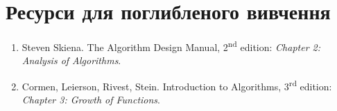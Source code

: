 \documentclass[12pt,a4paper]{report}
\begin{document}
\section*{Ресурси для поглибленого вивчення}
\begin{enumerate}
    \item Steven Skiena. The Algorithm Design Manual, 2\textsuperscript{nd} edition: {\itshape Chapter 2: Analysis of Algorithms}.
    \item Cormen, Leierson, Rivest, Stein. Introduction to Algorithms, 3\textsuperscript{rd} edition: {\itshape Chapter 3: Growth of Functions}.
\end{enumerate}
\end{document}
